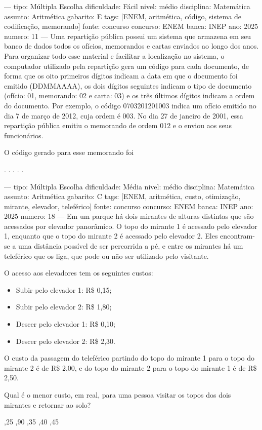 ---
tipo: Múltipla Escolha
dificuldade: Fácil
nivel: médio
disciplina: Matemática
assunto: Aritmética
gabarito: E
tags: [ENEM, aritmética, código, sistema de codificação, memorando]
fonte: concurso
concurso: ENEM
banca: INEP
ano: 2025
numero: 11
---
\question
Uma repartição pública possui um sistema que armazena em seu banco de dados todos os ofícios, memorandos e cartas enviados ao longo dos anos. Para organizar todo esse material e facilitar a localização no sistema, o computador utilizado pela repartição gera um código para cada documento, de forma que os oito primeiros dígitos indicam a data em que o documento foi emitido (DDMMAAAA), os dois dígitos seguintes indicam o tipo de documento (ofício: 01, memorando: 02 e carta: 03) e os três últimos dígitos indicam a ordem do documento. Por exemplo, o código 0703201201003 indica um ofício emitido no dia 7 de março de 2012, cuja ordem é 003. No dia 27 de janeiro de 2001, essa repartição pública emitiu o memorando de ordem 012 e o enviou aos seus funcionários.

O código gerado para esse memorando foi
\begin{choices}
.
.
.
.
.
\end{choices}

---
tipo: Múltipla Escolha
dificuldade: Média
nivel: médio
disciplina: Matemática
assunto: Aritmética
gabarito: C
tags: [ENEM, aritmética, custo, otimização, mirante, elevador, teleférico]
fonte: concurso
concurso: ENEM
banca: INEP
ano: 2025
numero: 18
---
\question
Em um parque há dois mirantes de alturas distintas que são acessados por elevador panorâmico. O topo do mirante 1 é acessado pelo elevador 1, enquanto que o topo do mirante 2 é acessado pelo elevador 2. Eles encontram-se a uma distância possível de ser percorrida a pé, e entre os mirantes há um teleférico que os liga, que pode ou não ser utilizado pelo visitante.

O acesso aos elevadores tem os seguintes custos:
\begin{itemize}
\item Subir pelo elevador 1: R\$ 0,15;
\item Subir pelo elevador 2: R\$ 1,80;
\item Descer pelo elevador 1: R\$ 0,10;
\item Descer pelo elevador 2: R\$ 2,30.
\end{itemize}

O custo da passagem do teleférico partindo do topo do mirante 1 para o topo do mirante 2 é de R\$ 2,00, e do topo do mirante 2 para o topo do mirante 1 é de R\$ 2,50.

Qual é o menor custo, em real, para uma pessoa visitar os topos dos dois mirantes e retornar ao solo?
\begin{choices}
,25
,90
,35
,40
,45
\end{choices}
